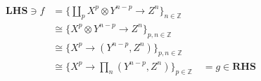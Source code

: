 \documentclass[preview]{standalone}
\begin{document}
$$
\begin{aligned}
\mathbf{LHS} \ni f & = \{\coprod_p X^p \otimes Y^{n-p} \to Z^n\}_{n \in \mathbb Z}\\
& \cong \{X^p \otimes Y^{n-p} \to Z^n\}_{p, n \in\mathbb Z}\\
& \cong \{X^p \to (Y^{n-p} , Z^n)\}_{p, n \in\mathbb Z}\\
& \cong \{X^p \to \prod_n (Y^{n-p} , Z^n)\}_{p \in\mathbb Z}\quad = g \in\mathbf{RHS}
\end{aligned}
$$
\end{document}
